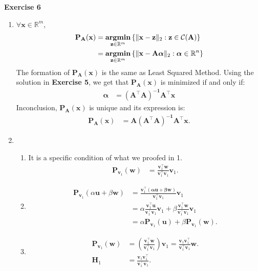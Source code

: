 \documentclass[11pt,letter,notitlepage]{article}
\newcommand{\proj}[2]{\textbf{P}_{#2} (#1)}
\DeclareMathOperator*{\argmin}{\bf argmin}
\begin{document}
\begin{solution}
	\textbf{Exercise 6}
	\begin{enumerate}
		\item
		$\forall \mathbf{x} \in \mathbb{R}^m $,
			\begin{align*}
				\proj{\mathbf{x}}{\mathbf{A}} &= \argmin_{\mathbf{z}\in\mathbb{R}^m}\,\{\|\mathbf{x}-\mathbf{z}\|_2: \mathbf{z}\in\mathcal{C}(\mathbf{A})\}\\
				&= \argmin_{\mathbf{z}\in\mathbb{R}^m}\,\{\|\mathbf{x}-\mathbf{A\bm{\alpha}}\|_2: \bm{\alpha} \in \mathbb{R}^n\}
			\end{align*}
			The formation of $\proj{\mathbf{x}}{\mathbf{A}}$ is the same as  Least Squared Method. Using the solution in \textbf{Exercise 5}, we get that $\proj{\mathbf{x}}{\mathbf{A}}$ is minimized if and only if:
			\begin{align*}
				\bm{\alpha}&=\mathbf{(A^{\top}A)^{-1}A^{\top}x}
			\end{align*}
			Inconclusion, $\proj{\mathbf{x}}{\mathbf{A}}$ is unique and its expression is:
			\begin{align*}
				\proj{\mathbf{x}}{\mathbf{A}}&=
				\mathbf{A(A^{\top}A)^{-1}A^{\top}x}.
			\end{align*}
			
			\item
			\begin{enumerate}
				\item
				It is a specific condition of what we proofed in 1.
				\begin{align*}
					\proj{\mathbf{w}}{\mathbf{v}_1}&=\frac{\mathbf{v}_1^{\top}\mathbf{w}}{\mathbf{v}_1^{\top}\mathbf{v}_1}\mathbf{v}_1.
				\end{align*}
				
				\item
				\begin{align*}
					\proj{\alpha\mathbf{u}+\beta\mathbf{w}}{\mathbf{v}_1}
					&=\frac{\mathbf{v}_1^{\top}\mathbf{(\alpha u+\beta w)}}{\mathbf{v}_1^{\top}\mathbf{v}_1}\mathbf{v}_1\\
					&=\alpha\frac{\mathbf{v}_1^{\top}\mathbf{u}}{\mathbf{v}_1^{\top}\mathbf{v}_1}\mathbf{v}_1+\beta\frac{\mathbf{v}_1^{\top}\mathbf{w}}{\mathbf{v}_1^{\top}\mathbf{v}_1}\mathbf{v}_1\\
					&=\alpha\proj{\mathbf{u}}{\mathbf{v}_1} + \beta \proj{\mathbf{w}}{\mathbf{v}_1}.
				\end{align*}
				
				\item
				\begin{align*}
					\proj{\mathbf{w}}{\mathbf{v}_1}
					&=(\frac{\mathbf{v}_1^{\top}\mathbf{w}}{\mathbf{v}_1^{\top}\mathbf{v}_1})\mathbf{v}_1=\frac{\mathbf{v}_1\mathbf{v}_1^{\top}}{\mathbf{v}_1^{\top}\mathbf{v}_1}\mathbf{w}.\\
					\mathbf{H}_1&=\frac{\mathbf{v}_1\mathbf{v}_1^{\top}}{\mathbf{v}_1^{\top}\mathbf{v}_1}.
				\end{align*}
				

\end{enumerate}
\end{enumerate}
\end{solution}
\end{document}
